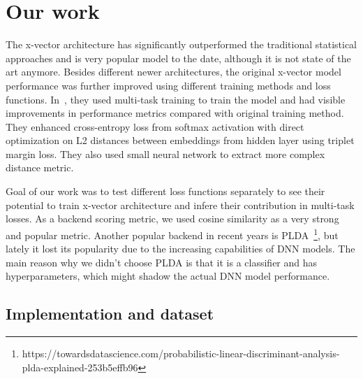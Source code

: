 \section{Our work}
The x-vector architecture has significantly outperformed the traditional statistical approaches and is very popular model to the date, although it is not state of the art anymore. Besides different newer architectures, the original x-vector model performance was further improved using different training methods and loss functions. In~\cite{x_vectors_triplet}, they used multi-task training to train the model and had visible improvements in performance metrics compared with original training method. They enhanced cross-entropy loss from softmax activation with direct optimization on L2 distances between embeddings from hidden layer using triplet margin loss. They also used small neural network to extract more complex distance metric.

\medskip
Goal of our work was to test different loss functions separately to see their potential to train x-vector architecture and infere their contribution in multi-task losses. As a backend scoring metric, we used cosine similarity as a very strong and popular metric. Another popular backend in recent years is PLDA~\footnote{https://towardsdatascience.com/probabilistic-linear-discriminant-analysis-plda-explained-253b5effb96}, but lately it lost its popularity due to the increasing capabilities of DNN models. The main reason why we didn't choose PLDA is that it is a classifier and has hyperparameters, which might shadow the actual DNN model performance.

\subsection*{Implementation and dataset}

